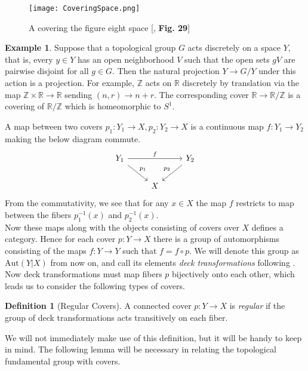 \documentclass{article}
\theoremstyle{definition}
\newtheorem{definition}[theorem]{Definition}
\newtheorem{example}[theorem]{Example}
\theoremstyle{remark}
\newcommand{\R}{\mathbb{R}}
\newcommand{\Z}{\mathbb{Z}}
\begin{document}
\begin{figure}[ht!]
\centering
\texttt{[image: CoveringSpace.png]}

\caption*{A covering the figure eight space [\cite{FomenkoFuchs}, \textbf{Fig. 29}]}
\end{figure}

\begin{example} Suppose that a topological group $G$ acts discretely on a space $Y$, that is, every $y \in Y$ has an open neighborhood $V$ such that the open sets $gV$ are pairwise disjoint for all $g  \in G$.
	Then the natural projection $Y \to G/Y$ under this action is a projection.
	For example, $\Z$ acts on $\R$ discretely by translation via the map $\Z \times \R \to \R$ sending $(n,r) \to n+r$.
	The corresponding cover $\R \to \R/\Z$ is a covering of $\R/\Z$ which is homeomorphic to $S^1$.
\end{example}

\indent A map between two covers $p_1: Y_1 \to X, p_2: Y_2 \to X$ is a continuous map $f: Y_1 \to Y_2$ making the below diagram commute.
\[\begin{tikzcd}
	{Y_1} && {Y_2} \\
	& X
	\arrow["f", from=1-1, to=1-3]
	\arrow["{p_1}", from=1-1, to=2-2]
	\arrow["{p_2}"', from=1-3, to=2-2]
\end{tikzcd}\]
From the commutativity, we see that for any $x \in X$ the map $f$ restricts to map between the fibers $p_1^{-1}(x)$ and $p_2^{-1}(x)$.\\
\indent Now these maps along with the objects consisting of covers over $X$ defines a category.
Hence for each cover $p:Y \to X$ there is a group of automorphisms consisting of the maps $f: Y \to Y$ such that $f = f \circ p$.
We will denote this group as $\text{Aut}(Y|X)$ from now on, and call its elements \textit{deck transformations} following \cite{FomenkoFuchs}.
Now deck transformations must map fibers $p$ bijectively onto each other, which leads us to consider the following types of covers.

\begin{definition}[Regular Covers]
	A connected cover $p: Y \to X$ is \textit{regular} if the group of deck transformations acts transitively on each fiber.
\end{definition}

We will not immediately make use of this definition, but it will be handy to keep in mind.
The following lemma will be necessary in relating the topological fundamental group with covers.
\end{document}

